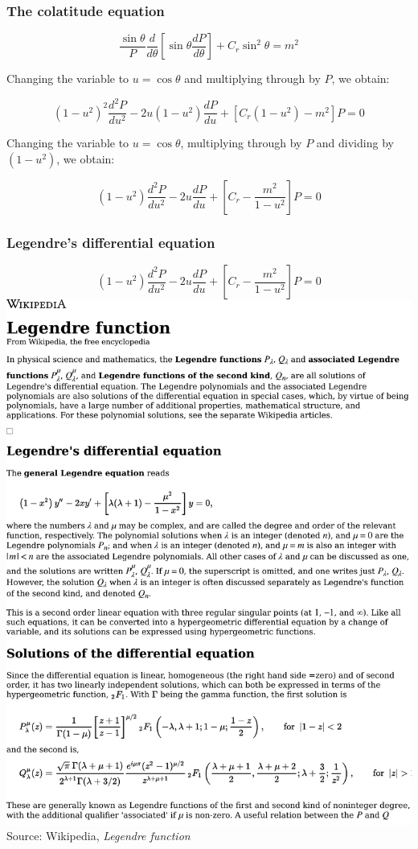 \documentclass{beamer}
\begin{document}
\begin{frame}
\frametitle{The colatitude equation}

\[ \frac{\sin\theta}{P} \frac{d}{d\theta}\left[\sin\theta\frac{dP}{d\theta}\right] + C_r \sin^2\theta = m^2 \]

Changing the variable to $u=\cos \theta$ and multiplying through by $P$, we obtain:

\[ (1-u^2)^2 \frac{d^2 P}{du^2} - 2u(1-u^2)\frac{dP}{du} + \left[C_r(1-u^2) - m^2\right]P = 0 \]

Changing the variable to $u=\cos \theta$, multiplying through by $P$ and dividing by $(1-u^2)$, we obtain:

\[ (1-u^2) \frac{d^2 P}{du^2} - 2u\frac{dP}{du} + \left[C_r - \frac{m^2}{1-u^2}\right]P = 0 \]

\end{frame}

\begin{frame}
\frametitle{Legendre's differential equation}
\[ (1-u^2) \frac{d^2 P}{du^2} - 2u\frac{dP}{du} + \left[C_r - \frac{m^2}{1-u^2}\right]P = 0 \]
\includegraphics[page=1, clip, trim=0in 3.7in 0in 3.5in, width=\textwidth]{Legendre function - Wikipedia.pdf}
\vfill
Source: Wikipedia, {\it Legendre function}
\end{frame}
\end{document}
